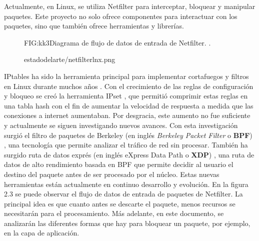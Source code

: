 Actualmente, en Linux, se utiliza Netfilter \cite{kk3} para interceptar, bloquear y manipular paquetes. Este proyecto no solo ofrece componentes para interactuar con los paquetes, sino que también ofrece herramientas y librerías.

\begin{figure}[Diagrama de flujo de datos de entrada de Netfilter.]{FIG:kk3}{Diagrama de flujo de datos de entrada de Netfilter. \cite{kk3}.}
  \begin{image}{}{}{estadodelarte/netfilterlnx.png}
  \end{image}
\end{figure}

IPtables ha sido la herramienta principal para implementar cortafuegos y filtros en Linux durante muchos años \cite{ciliumio}. Con el crecimiento de las reglas de configuración y bloqueo se creó la herramienta IPset \cite{ipsecaa}, que permitió comprimir estas reglas en una tabla hash con el fin de aumentar la velocidad de respuesta a medida que las conexiones a internet aumentaban. Por desgracia, este aumento no fue suficiente y actualmente se siguen investigando nuevos avances. Con esta investigación surgió el filtro de paquetes de Berkeley (en inglés\textit{ Berkeley Packet Filter }o \textbf{BPF}) \cite{kk1}, una tecnología que permite analizar el tráfico de red sin procesar. También ha surgido ruta de datos exprés (en inglés  eXpress Data Path o \textbf{XDP}) \cite{kk2}, una ruta de datos de alto rendimiento basada en BPF que permite decidir al usuario el destino del paquete antes de ser procesado por el núcleo. Estas nuevas herramientas están actualmente en continuo desarrollo y evolución. En la figura 2.3 se puede observar el flujo de datos de entrada de paquetes de Netfilter. La principal idea es que cuanto antes se descarte el paquete, menos recursos se necesitarán para el procesamiento. Más adelante, en este documento, se analizarán las diferentes formas que hay para bloquear un paquete, por ejemplo, en la capa de aplicación.
